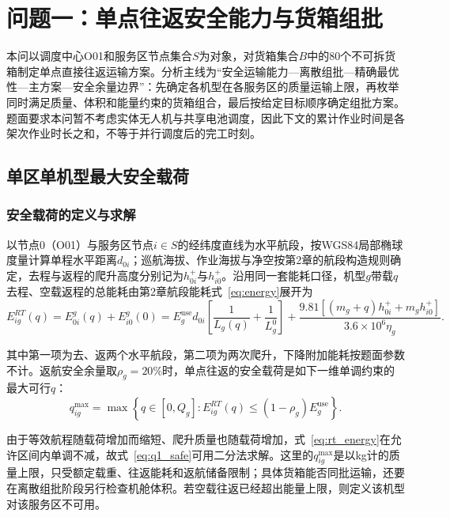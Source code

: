 \section{问题一：单点往返安全能力与货箱组批}

本问以调度中心O01和服务区节点集合$S$为对象，对货箱集合$B$中的80个不可拆货箱制定单点直接往返运输方案。分析主线为“安全运输能力—离散组批—精确最优性—主方案—安全余量边界”：先确定各机型在各服务区的质量运输上限，再枚举同时满足质量、体积和能量约束的货箱组合，最后按给定目标顺序确定组批方案。题面要求本问暂不考虑实体无人机与共享电池调度，因此下文的累计作业时间是各架次作业时长之和，不等于并行调度后的完工时刻。

\subsection{单区单机型最大安全载荷}

\subsubsection{安全载荷的定义与求解}

以节点0（O01）与服务区节点$i\in S$的经纬度直线为水平航段，按WGS84局部椭球度量计算单程水平距离$d_{0i}$；巡航海拔、作业海拔与净空按第2章的航段构造规则确定，去程与返程的爬升高度分别记为$h_{0i}^{+}$与$h_{i0}^{+}$。沿用同一套能耗口径，机型$g$带载$q$去程、空载返程的总能耗由第2章航段能耗式~\eqref{eq:energy}展开为
\begin{equation}
E_{ig}^{RT}(q)=E_{0i}^g(q)+E_{i0}^g(0)
=E_g^{\mathrm{use}}d_{0i}\left[\frac{1}{L_g(q)}+\frac{1}{L_g^0}\right]
+\frac{9.81\left[(m_g+q)h_{0i}^++m_g h_{i0}^+\right]}{3.6\times10^6\eta_g}.
\label{eq:rt_energy}
\end{equation}

其中第一项为去、返两个水平航段，第二项为两次爬升，下降附加能耗按题面参数不计。返航安全余量取$\rho_g=20\%$时，单点往返的安全载荷是如下一维单调约束的最大可行$q$：
\begin{equation}
q_{ig}^{\max}=\max\left\{q\in[0,Q_g]:E_{ig}^{RT}(q)\le(1-\rho_g)E_g^{\mathrm{use}}\right\}.
\label{eq:q1_safe}
\end{equation}

由于等效航程随载荷增加而缩短、爬升质量也随载荷增加，式~\eqref{eq:rt_energy}在允许区间内单调不减，故式~\eqref{eq:q1_safe}可用二分法求解。这里的$q_{ig}^{\max}$是以kg计的质量上限，只受额定载重、往返能耗和返航储备限制；具体货箱能否同批运输，还要在离散组批阶段另行检查机舱体积。若空载往返已经超出能量上限，则定义该机型对该服务区不可用。

